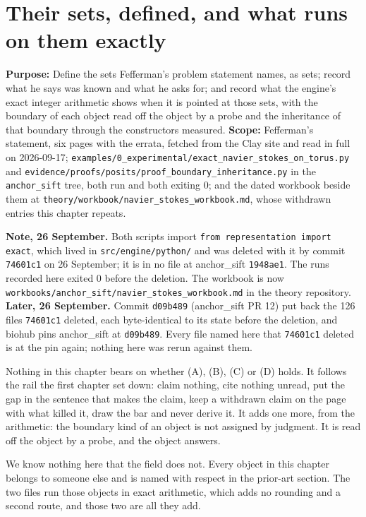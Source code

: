 \chapter{Their sets, defined, and what runs on them exactly}

\textbf{Purpose:} Define the sets Fefferman's problem statement names, as sets; record what he says
was known and what he asks for; and record what the engine's exact integer arithmetic shows when it
is pointed at those sets, with the boundary of each object read off the object by a probe and the
inheritance of that boundary through the constructors measured. \textbf{Scope:} Fefferman's
statement, six pages with the errata, fetched from the Clay site and read in full on 2026-09-17;
\texttt{examples/\allowbreak{}0\_experimental/\allowbreak{}exact\_navier\_stokes\_on\_torus.py}
and \texttt{evidence/\allowbreak{}proofs/\allowbreak{}posits/\allowbreak{}proof\_boundary\_inheritance.py}
in the \texttt{anchor\_sift} tree, both run and both exiting 0; and the dated workbook beside them at
\texttt{theory/\allowbreak{}workbook/\allowbreak{}navier\_stokes\_workbook.md}, whose withdrawn
entries this chapter repeats.

\textbf{Note, 26 September.} Both scripts import \texttt{from representation import exact}, which lived
in \texttt{src/\allowbreak{}engine/\allowbreak{}python/} and was deleted with it by commit
\texttt{74601c1} on 26 September; it is in no file at anchor\_sift \texttt{1948ae1}. The runs recorded
here exited 0 before the deletion. The workbook is now
\texttt{workbooks/\allowbreak{}anchor\_sift/\allowbreak{}navier\_stokes\_workbook.md} in the theory
repository. \textbf{Later, 26 September.} Commit \texttt{d09b489} (anchor\_sift PR 12) put back
the 126 files \texttt{74601c1} deleted, each byte-identical to its state before the deletion, and
biohub pins anchor\_sift at \texttt{d09b489}. Every file named here that \texttt{74601c1} deleted is
at the pin again; nothing here was rerun against them.

Nothing in this chapter bears on whether (A), (B), (C) or (D) holds. It follows the rail the first
chapter set down: claim nothing, cite nothing unread, put the gap in the sentence that makes the
claim, keep a withdrawn claim on the page with what killed it, draw the bar and never derive it. It
adds one more, from the arithmetic: the boundary kind of an object is not assigned by judgment. It is
read off the object by a probe, and the object answers.

We know nothing here that the field does not. Every object in this chapter belongs to someone else
and is named with respect in the prior-art section. The two files run those objects in exact
arithmetic, which adds no rounding and a second route, and those two are all they add.


